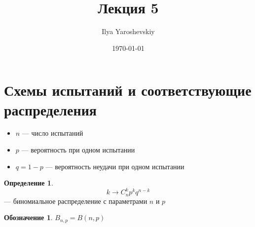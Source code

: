\documentclass[english]{article}
\author{Ilya Yaroshevskiy}
\date{\today}
\title{Лекция 5}
\theoremstyle{plain}
\theoremstyle{remark}
\theoremstyle{definition}
\newtheorem*{definition}{Определение}
\newtheorem*{symb}{Обозначение}
\begin{document}
\maketitle
\tableofcontents


\section{Схемы испытаний и соответствующие распределения}
\label{sec:org40096ed}
\begin{itemize}
\item \(n\) --- число испытаний
\item \(p\) --- вероятность при одном испытании
\item \(q = 1 - p\) --- вероятность неудачи при одном испытании
\end{itemize}


\begin{definition}
\[ k \to C^k_n p^k q^{n - k} \] --- биномиальное распределение с параметрами \(n\) и \(p\)
\end{definition}
\begin{symb}
\(B_{n,p} = B(n, p)\)
\end{symb}
\end{document}
